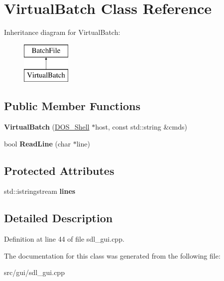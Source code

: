 \hypertarget{classVirtualBatch}{\section{Virtual\-Batch Class Reference}
\label{classVirtualBatch}
}
Inheritance diagram for Virtual\-Batch\-:\begin{figure}[H]
\begin{center}
\leavevmode
\includegraphics[height=2.000000cm]{classVirtualBatch}
\end{center}
\end{figure}
\subsection*{Public Member Functions}
\begin{DoxyCompactItemize}
\item 
\hypertarget{classVirtualBatch_ae7d064d0fd0b8ef53b344eb8239ec41f}{{\bfseries Virtual\-Batch} (\hyperlink{classDOS__Shell}{D\-O\-S\-\_\-\-Shell} $\ast$host, const std\-::string \&cmds)}\label{classVirtualBatch_ae7d064d0fd0b8ef53b344eb8239ec41f}

\item 
\hypertarget{classVirtualBatch_a2d5e383678a9a43bd5d0ac5753279fba}{bool {\bfseries Read\-Line} (char $\ast$line)}\label{classVirtualBatch_a2d5e383678a9a43bd5d0ac5753279fba}

\end{DoxyCompactItemize}
\subsection*{Protected Attributes}
\begin{DoxyCompactItemize}
\item 
\hypertarget{classVirtualBatch_ad920a5d596d8cc0372e8eb1e6512448e}{std\-::istringstream {\bfseries lines}}\label{classVirtualBatch_ad920a5d596d8cc0372e8eb1e6512448e}

\end{DoxyCompactItemize}


\subsection{Detailed Description}


Definition at line 44 of file sdl\-\_\-gui.\-cpp.



The documentation for this class was generated from the following file\-:\begin{DoxyCompactItemize}
\item 
src/gui/sdl\-\_\-gui.\-cpp\end{DoxyCompactItemize}
